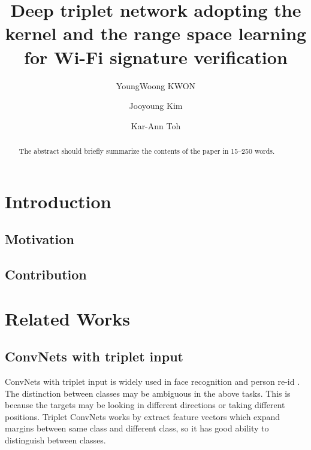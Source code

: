 \documentclass[runningheads]{llncs}
\begin{document}
%
\title{Deep triplet network adopting the kernel and the range space learning for Wi-Fi signature verification}
%
%
\author{YoungWoong KWON \and
Jooyoung Kim  \and
Kar-Ann Toh}
%
%
%
\maketitle              %
%
\begin{abstract}
The abstract should briefly summarize the contents of the paper in
15--250 words.

\end{abstract}
%
%
%
\section{Introduction}

\subsection{Motivation}

\subsection{Contribution}

\section{Related Works}


\subsection{ConvNets with triplet input}

ConvNets with triplet input is widely used in face recognition \cite{schroff2015facenet} and person re-id \cite{cheng2016person,chen2017beyond}.
The distinction between classes may be ambiguous in the above tasks. This is because the targets may be looking in different directions or taking different positions.
Triplet ConvNets works by extract feature vectors which expand margins between same class and different class, so it has good ability to distinguish between classes. 
\end{document}
